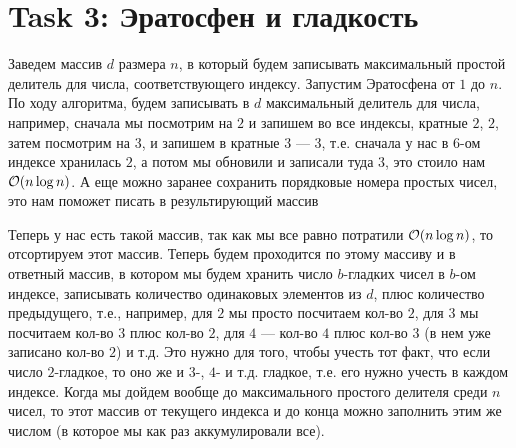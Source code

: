 \section{Task 3: Эратосфен и гладкость}
\begin{solution}
    Заведем массив $d$ размера $n$, в который будем записывать максимальный простой делитель для числа, соответствующего индексу.
    Запустим Эратосфена от $1$ до $n$. По ходу алгоритма, будем записывать в $d$ максимальный делитель для числа, например, сначала мы посмотрим на $2$ и запишем во все индексы, кратные $2$, $2$, затем посмотрим на $3$, и запишем в кратные $3$ --- $3$, т.е. сначала у нас в $6$-ом индексе хранилась $2$, а потом мы обновили и записали туда $3$, это стоило нам $\mathcal{O}(n\log n)$. А еще можно заранее сохранить порядковые номера простых чисел, это нам поможет писать в результирующий массив

    Теперь у нас есть такой массив, так как мы все равно потратили $\mathcal{O}(n\log n)$, то отсортируем этот массив. Теперь будем проходится по этому массиву и в ответный массив, в котором мы будем хранить число $b$-гладких чисел в $b$-ом индексе, записывать количество одинаковых элементов из $d$, плюс количество предыдущего, т.е., например, для $2$ мы просто посчитаем кол-во $2$, для $3$ мы посчитаем кол-во $3$ плюс кол-во $2$, для $4$ --- кол-во $4$ плюс кол-во $3$ (в нем уже записано кол-во $2$) и т.д. Это нужно для того, чтобы учесть тот факт, что если число $2$-гладкое, то оно же и $3$-, $4$- и т.д. гладкое, т.е. его нужно учесть в каждом индексе. Когда мы дойдем вообще до максимального простого делителя среди $n$ чисел, то этот массив от текущего индекса и до конца можно заполнить этим же числом (в которое мы как раз аккумулировали все).
\end{solution}